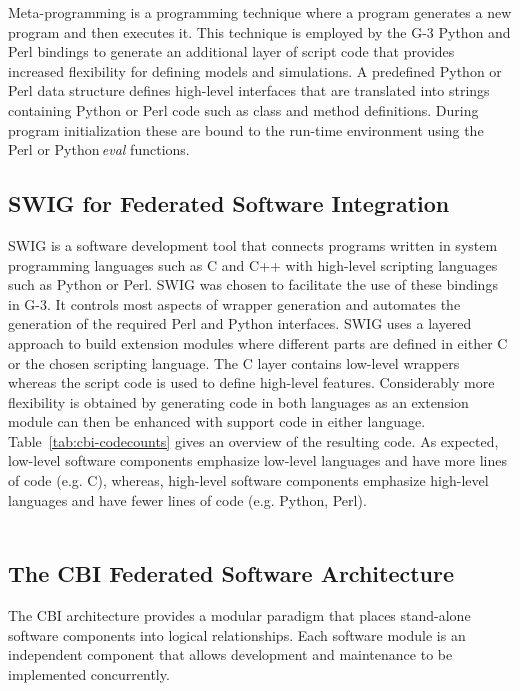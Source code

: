 \documentclass[10pt]{article}
\begin{document}
Meta-programming is a programming technique where a program generates
a new program and then executes it.  This technique is employed by
the G-3 Python and Perl bindings to generate an
additional layer of script code that provides increased flexibility
for defining models and simulations.  A predefined Python  or
Perl data structure defines high-level interfaces that are translated
into strings containing Python or Perl code such as class and method
definitions.  During program initialization these are bound to the run-time
environment using the Perl or Python\,{\it eval} functions.

\subsection*{SWIG for Federated Software Integration}

SWIG is a software development tool that connects programs written
in system programming languages such as C and C++ with high-level scripting 
languages such as Python or Perl. SWIG was chosen to facilitate 
the use of these bindings in
G-3. It controls most aspects of wrapper
generation and automates the generation of the required Perl and
Python interfaces. SWIG uses a layered approach to build extension
modules where different parts are defined in either C or the chosen
scripting language. The C layer contains low-level wrappers whereas
the script code is used to define high-level features.  Considerably
more flexibility is obtained by generating code in both languages as
an extension module can then be enhanced with support code in either
language.  Table~\ref{tab:cbi-codecounts} gives an overview of the
resulting code.  As expected, low-level software components emphasize
low-level languages and have more lines of code (e.g. C), whereas, high-level
software components emphasize high-level languages and have fewer
lines of code (e.g. Python, Perl).\\

\\

\subsection*{The CBI Federated Software Architecture}
\label{subsec:cbi}

The CBI architecture provides a modular paradigm that places stand-alone
software components into logical relationships.  Each software module
is an independent component that allows development and
maintenance to be implemented concurrently.
\end{document}
